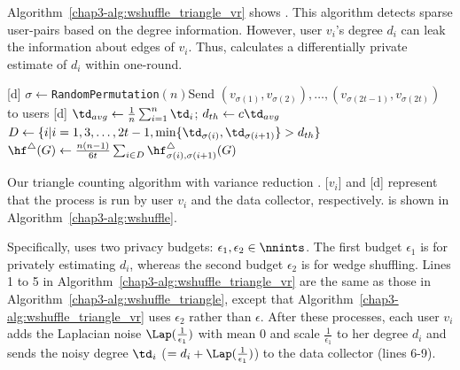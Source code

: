 Algorithm~\ref{chap3-alg:wshuffle_triangle_vr} shows \AlgWSTriVR{}. 
This algorithm detects sparse user-pairs based on the degree information. 
However, user $v_i$'s degree $d_i$ can leak the information about edges of $v_i$. 
Thus, \AlgWSTriVR{} calculates a differentially private estimate of $d_i$ within one-round. 

\setlength{\algomargin}{5mm}
\begin{algorithm}[t]
  \SetAlgoLined
  [d] $\sigma \leftarrow$\texttt{RandomPermutation}$(n)$\;
  [d] Send $(v_{\sigma(1)}, v_{\sigma(2)}), \ldots, (v_{\sigma(2t-1)}, v_{\sigma(2t)})$ to users\;
  [d] $\td_{avg} \leftarrow \frac{1}{n} \sum_{i=1}^n \td_i$; $d_{th} \leftarrow c \td_{avg}$\;
  [d] $D \leftarrow \{i | i = 1, 3, \ldots, 2t-1, 
  \min\{\td_{\sigma(i)}, \td_{\sigma(i+1)}\} > d_{th}\}$\;
  [d] $\hf^\triangle(G) \leftarrow \frac{n(n-1)}{6t} \sum_{i \in D} \hf_{\sigma(i),\sigma(i+1)}^\triangle(G)$\;
  \caption{Our triangle counting algorithm with variance reduction \AlgWSTriVR{}.
  [$v_i$] and [d] represent that the process is run by user $v_i$ and the data collector, respectively. 
  \AlgWS{} is shown in Algorithm~\ref{chap3-alg:wshuffle}. 
  }\label{chap3-alg:wshuffle_triangle_vr}
\end{algorithm}

Specifically, \AlgWSTriVR{} uses two privacy budgets: $\epsilon_1, \epsilon_2 \in \nnints$. 
The first budget $\epsilon_1$ is for privately estimating $d_i$, whereas the second budget $\epsilon_2$ is for wedge shuffling. 
Lines 1 to 5 in Algorithm~\ref{chap3-alg:wshuffle_triangle_vr} are the same as those in Algorithm~\ref{chap3-alg:wshuffle_triangle}, except that Algorithm~\ref{chap3-alg:wshuffle_triangle_vr} uses $\epsilon_2$ rather than $\epsilon$. 
After these processes, each user $v_i$ adds the Laplacian noise $\Lap(\frac{1}{\epsilon_1})$ with mean $0$ and scale $\frac{1}{\epsilon_1}$ to her degree $d_i$ and sends the noisy degree $\td_i$ ($= d_i + \Lap(\frac{1}{\epsilon_1})$) to the data collector (lines 6-9). 

